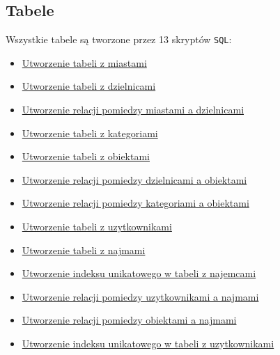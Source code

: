 \subsection{Tabele}

Wszystkie tabele są tworzone przez 13 skryptów \texttt{SQL}:
\begin{itemize}
	\item \href{run:Sources/SQL/1. Tabele/001_Utworzenie_tabeli_z_miastami.sql}{Utworzenie tabeli z miastami}
	\item \href{run:Sources/SQL/1. Tabele/002_Utworzenie_tabeli_z_dzielnicami.sql}{Utworzenie tabeli z dzielnicami}
	\item \href{run:Sources/SQL/1. Tabele/003_Utworzenie_relacji_pomiedzy_miastami_a_dzielnicami.sql}{Utworzenie relacji pomiedzy miastami a dzielnicami}
	\item \href{run:Sources/SQL/1. Tabele/004_Utworzenie_tabeli_z_kategoriami.sql}{Utworzenie tabeli z kategoriami}
	\item \href{run:Sources/SQL/1. Tabele/005_Utworzenie_tabeli_z_obiektami.sql}{Utworzenie tabeli z obiektami}
	\item \href{run:Sources/SQL/1. Tabele/006_Utworzenie_relacji_pomiedzy_dzielnicami_a_obiektami.sql}{Utworzenie relacji pomiedzy dzielnicami a obiektami}
	\item \href{run:Sources/SQL/1. Tabele/007_Utworzenie_relacji_pomiedzy_kategoriami_a_obiektami.sql}{Utworzenie relacji pomiedzy kategoriami a obiektami}
	\item \href{run:Sources/SQL/1. Tabele/008_Utworzenie_tabeli_z_uzytkownikami.sql}{Utworzenie tabeli z uzytkownikami}
	\item \href{run:Sources/SQL/1. Tabele/009_Utworzenie_tabeli_z_najmami.sql}{Utworzenie tabeli z najmami}
	\item \href{run:Sources/SQL/1. Tabele/010_Utworzenie_indeksu_unikatowego_w_tabeli_z_najemcami.sql}{Utworzenie indeksu unikatowego w tabeli z najemcami}
	\item \href{run:Sources/SQL/1. Tabele/011_Utworzenie_relacji_pomiedzy_uzytkownikami_a_najmami.sql}{Utworzenie relacji pomiedzy uzytkownikami a najmami}
	\item \href{run:Sources/SQL/1. Tabele/012_Utworzenie_relacji_pomiedzy_obiektami_a_najmami.sql}{Utworzenie relacji pomiedzy obiektami a najmami}
	\item \href{run:Sources/SQL/1. Tabele/013_Utworzenie_indeksu_unikatowego_w_tabeli_z_uzytkownikami}{Utworzenie indeksu unikatowego w tabeli z uzytkownikami}
\end{itemize}

